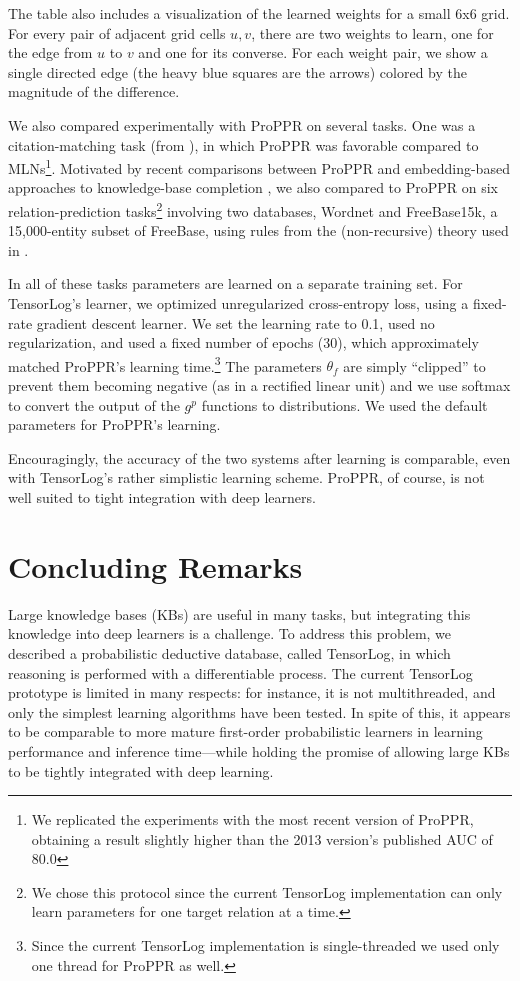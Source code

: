 \documentclass{article}
\begin{document}
The table also includes a visualization of the learned weights for a
small 6x6 grid.  For every pair of adjacent grid cells $u,v$, there
are two weights to learn, one for the edge from $u$ to $v$ and one for
its converse.  For each weight pair, we show a single directed edge
(the heavy blue squares are the arrows) colored by the magnitude of
the difference.

We also compared experimentally with ProPPR on several tasks.  One was
a citation-matching task (from \cite{wang2013programming}), in which
ProPPR was favorable compared to MLNs\footnote{We replicated the
  experiments with the most recent version of ProPPR, obtaining a
  result slightly higher than the 2013 version's published AUC of
  80.0}.  Motivated by recent comparisons between ProPPR and
embedding-based approaches to knowledge-base completion
\cite{Wang-Cohen:2016:IJCAI}, we also compared to ProPPR on six
relation-prediction tasks\footnote{We chose this protocol since the
  current TensorLog implementation can only learn parameters for one
  target relation at a time.} involving two databases, Wordnet and
FreeBase15k, a 15,000-entity subset of FreeBase, using rules from the
(non-recursive) theory used in \cite{Wang-Cohen:2016:IJCAI}.

In all of these tasks parameters are learned on a separate training
set.  For TensorLog's learner, we optimized unregularized
cross-entropy loss, using a fixed-rate gradient descent learner.  We
set the learning rate to 0.1, used no regularization, and used a fixed
number of epochs (30), which approximately matched ProPPR's learning
time.\footnote{Since the current TensorLog implementation is
  single-threaded we used only one thread for ProPPR as well.}  The
parameters $\theta_f$ are simply ``clipped'' to prevent them becoming
negative (as in a rectified linear unit) and we use softmax to convert
the output of the $g^p$ functions to distributions.  We used the
default parameters for ProPPR's learning.

Encouragingly, the accuracy of the two systems after learning is
comparable, even with TensorLog's rather simplistic learning scheme.
ProPPR, of course, is not well suited to tight integration with deep
learners.

\section{Concluding Remarks}

Large knowledge bases (KBs) are useful in many tasks, but integrating
this knowledge into deep learners is a challenge.  To address this
problem, we described a probabilistic deductive database, called
TensorLog, in which reasoning is performed with a differentiable
process.  The current TensorLog prototype is limited in many respects:
for instance, it is not multithreaded, and only the simplest learning
algorithms have been tested.  In spite of this, it appears to be
comparable to more mature first-order probabilistic learners in
learning performance and inference time---while holding the promise of
allowing large KBs to be tightly integrated with deep learning.
\end{document}
